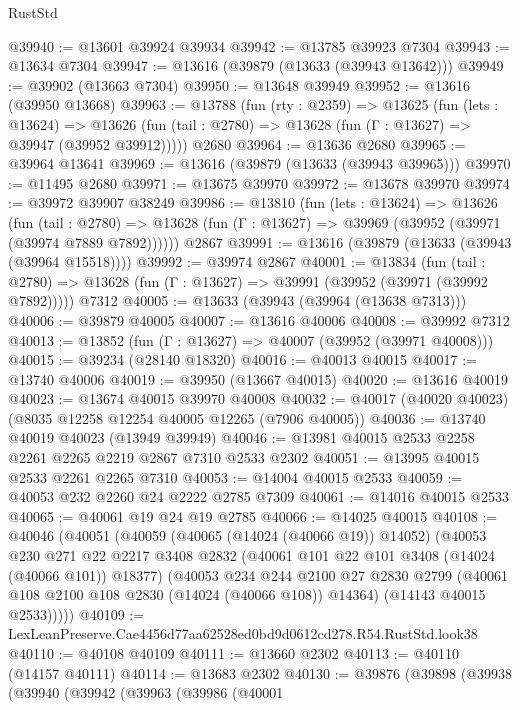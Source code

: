 \begin{lexlean}{RustStd}
\begin{coremodule}
@39940 := @13601 @39924 @39934
@39942 := @13785 @39923 @7304
@39943 := @13634 @7304
@39947 := @13616 (@39879 (@13633 (@39943 @13642)))
@39949 := @39902 (@13663 @7304)
@39950 := @13648 @39949
@39952 := @13616 (@39950 @13668)
@39963 := @13788
    (fun (rty : @2359) =>
    @13625
      (fun (lets : @13624) =>
      @13626 (fun (tail : @2780) => @13628 (fun (Γ : @13627) => @39947 (@39952 @39912)))))
    @2680
@39964 := @13636 @2680
@39965 := @39964 @13641
@39969 := @13616 (@39879 (@13633 (@39943 @39965)))
@39970 := @11495 @2680
@39971 := @13675 @39970
@39972 := @13678 @39970
@39974 := @39972 @39907 @38249
@39986 := @13810
    (fun (lets : @13624) =>
    @13626
      (fun (tail : @2780) =>
      @13628 (fun (Γ : @13627) => @39969 (@39952 (@39971 (@39974 @7889 @7892))))))
    @2867
@39991 := @13616 (@39879 (@13633 (@39943 (@39964 @15518))))
@39992 := @39974 @2867
@40001 := @13834
    (fun (tail : @2780) => @13628 (fun (Γ : @13627) => @39991 (@39952 (@39971 (@39992 @7892)))))
    @7312
@40005 := @13633 (@39943 (@39964 (@13638 @7313)))
@40006 := @39879 @40005
@40007 := @13616 @40006
@40008 := @39992 @7312
@40013 := @13852 (fun (Γ : @13627) => @40007 (@39952 (@39971 @40008)))
@40015 := @39234 (@28140 @18320)
@40016 := @40013 @40015
@40017 := @13740 @40006
@40019 := @39950 (@13667 @40015)
@40020 := @13616 @40019
@40023 := @13674 @40015 @39970 @40008
@40032 := @40017 (@40020 @40023) (@8035 @12258 @12254 @40005 @12265 (@7906 @40005))
@40036 := @13740 @40019 @40023 (@13949 @39949)
@40046 := @13981 @40015 @2533 @2258 @2261 @2265 @2219 @2867 @7310 @2533 @2302
@40051 := @13995 @40015 @2533 @2261 @2265 @7310
@40053 := @14004 @40015 @2533
@40059 := @40053 @232 @2260 @24 @2222 @2785 @7309
@40061 := @14016 @40015 @2533
@40065 := @40061 @19 @24 @19 @2785
@40066 := @14025 @40015
@40108 := @40046
    (@40051
      (@40059
        (@40065 (@14024 (@40066 @19)) @14052)
        (@40053
          @230
          @271
          @22
          @2217
          @3408
          @2832
          (@40061 @101 @22 @101 @3408 (@14024 (@40066 @101)) @18377)
          (@40053
            @234
            @244
            @2100
            @27
            @2830
            @2799
            (@40061 @108 @2100 @108 @2830 (@14024 (@40066 @108)) @14364)
            (@14143 @40015 @2533)))))
@40109 := LexLeanPreserve.Cae4456d77aa62528ed0bd9d0612cd278.R54.RustStd.look38
@40110 := @40108 @40109
@40111 := @13660 @2302
@40113 := @40110 (@14157 @40111)
@40114 := @13683 @2302
@40130 := @39876
    (@39898
      (@39938
        (@39940
          (@39942
            (@39963
              (@39986
                (@40001

\end{coremodule}
\end{lexlean}
